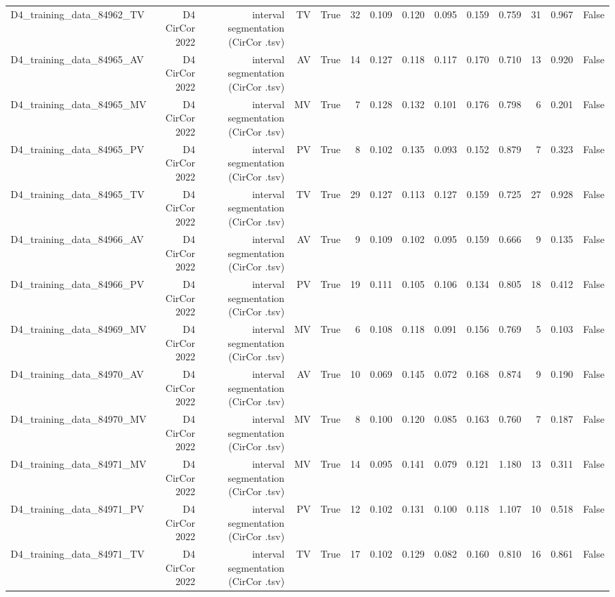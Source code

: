 \begin{table}[htbp]
\begin{tabular}{lrrrrrrrrrrrrr}
    D4\_training\_data\_84962\_TV & D4 CirCor 2022 & interval segmentation (CirCor .tsv) & TV & True & 32 & 0.109 & 0.120 & 0.095 & 0.159 & 0.759 & 31 & 0.967 & False \\
    D4\_training\_data\_84965\_AV & D4 CirCor 2022 & interval segmentation (CirCor .tsv) & AV & True & 14 & 0.127 & 0.118 & 0.117 & 0.170 & 0.710 & 13 & 0.920 & False \\
    D4\_training\_data\_84965\_MV & D4 CirCor 2022 & interval segmentation (CirCor .tsv) & MV & True & 7 & 0.128 & 0.132 & 0.101 & 0.176 & 0.798 & 6 & 0.201 & False \\
    D4\_training\_data\_84965\_PV & D4 CirCor 2022 & interval segmentation (CirCor .tsv) & PV & True & 8 & 0.102 & 0.135 & 0.093 & 0.152 & 0.879 & 7 & 0.323 & False \\
    D4\_training\_data\_84965\_TV & D4 CirCor 2022 & interval segmentation (CirCor .tsv) & TV & True & 29 & 0.127 & 0.113 & 0.127 & 0.159 & 0.725 & 27 & 0.928 & False \\
    D4\_training\_data\_84966\_AV & D4 CirCor 2022 & interval segmentation (CirCor .tsv) & AV & True & 9 & 0.109 & 0.102 & 0.095 & 0.159 & 0.666 & 9 & 0.135 & False \\
    D4\_training\_data\_84966\_PV & D4 CirCor 2022 & interval segmentation (CirCor .tsv) & PV & True & 19 & 0.111 & 0.105 & 0.106 & 0.134 & 0.805 & 18 & 0.412 & False \\
    D4\_training\_data\_84969\_MV & D4 CirCor 2022 & interval segmentation (CirCor .tsv) & MV & True & 6 & 0.108 & 0.118 & 0.091 & 0.156 & 0.769 & 5 & 0.103 & False \\
    D4\_training\_data\_84970\_AV & D4 CirCor 2022 & interval segmentation (CirCor .tsv) & AV & True & 10 & 0.069 & 0.145 & 0.072 & 0.168 & 0.874 & 9 & 0.190 & False \\
    D4\_training\_data\_84970\_MV & D4 CirCor 2022 & interval segmentation (CirCor .tsv) & MV & True & 8 & 0.100 & 0.120 & 0.085 & 0.163 & 0.760 & 7 & 0.187 & False \\
    D4\_training\_data\_84971\_MV & D4 CirCor 2022 & interval segmentation (CirCor .tsv) & MV & True & 14 & 0.095 & 0.141 & 0.079 & 0.121 & 1.180 & 13 & 0.311 & False \\
    D4\_training\_data\_84971\_PV & D4 CirCor 2022 & interval segmentation (CirCor .tsv) & PV & True & 12 & 0.102 & 0.131 & 0.100 & 0.118 & 1.107 & 10 & 0.518 & False \\
    D4\_training\_data\_84971\_TV & D4 CirCor 2022 & interval segmentation (CirCor .tsv) & TV & True & 17 & 0.102 & 0.129 & 0.082 & 0.160 & 0.810 & 16 & 0.861 & False \\

\end{tabular}
\end{table}
